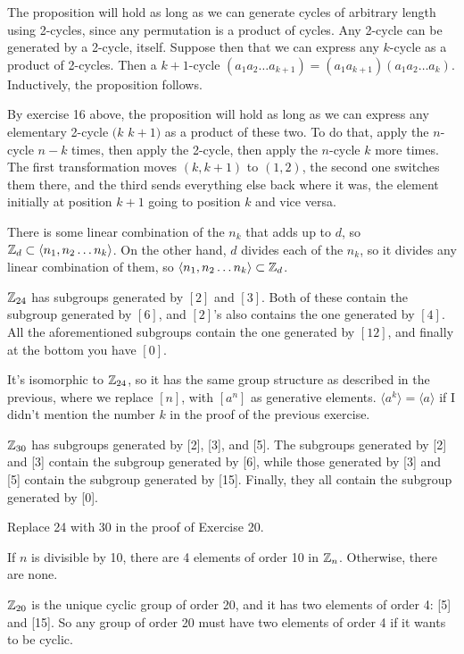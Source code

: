 \documentclass[11pt, oneside]{article}   	%
\begin{document}
\ee
\item The proposition will hold as long as we can generate cycles of arbitrary length using 2-cycles, since any permutation is a product of cycles. Any 2-cycle can be generated by a 2-cycle, itself. Suppose then that we can express any $k$-cycle as a product of 2-cycles. Then a $k+1$-cycle $(a_1a_2\ldots a_{k+1}) = (a_1a_{k+1})(a_1a_2\ldots a_k)$. Inductively, the proposition follows.
\item By exercise 16 above, the proposition will hold as long as we can express any elementary 2-cycle $(k$ $k+1)$ as a product of these two. To do that, apply the $n$-cycle $n-k$ times, then apply the 2-cycle, then apply the $n$-cycle $k$ more times. The first transformation moves $(k, k+1)$ to $(1, 2)$, the second one switches them there, and the third sends everything else back where it was, the element initially at position $k+1$ going to position $k$ and vice versa.
\item There is some linear combination of the $n_k$ that adds up to $d$, so $\mathbb{Z}_d \subset \langle n_1, n_2 \ldots n_k \rangle$. On the other hand, $d$ divides each of the $n_k$, so it divides any linear combination of them, so $\langle n_1, n_2 \ldots n_k \rangle \subset \mathbb{Z}_d$.
\item $\mathbb{Z}_{24}$ has subgroups generated by $[2]$ and $[3]$. Both of these contain the subgroup generated by $[6]$, and $[2]$'s also contains the one generated by $[4]$. All the aforementioned subgroups contain the one generated by $[12]$, and finally at the bottom you have $[0]$.
\item It's isomorphic to $\mathbb{Z}_{24}$, so it has the same group structure as described in the previous, where we replace $[n]$, with $[a^n]$ as generative elements. $\langle a^k \rangle = \langle a \rangle$ if I didn't mention the number $k$ in the proof of the previous exercise.
\item $\mathbb{Z}_{30}$ has subgroups generated by [2], [3], and [5]. The subgroups generated by [2] and [3] contain the subgroup generated by [6], while those generated by [3] and [5] contain the subgroup generated by [15]. Finally, they all contain the subgroup generated by [0].
\item Replace 24 with 30 in the proof of Exercise 20.
\item If $n$ is divisible by 10, there are 4 elements of order 10 in $\mathbb{Z}_n$. Otherwise, there are none.
\item $\mathbb{Z}_{20}$ is the unique cyclic group of order 20, and it has two elements of order 4: [5] and [15]. So any group of order 20 must have two elements of order 4 if it wants to be cyclic.
\end{document}

